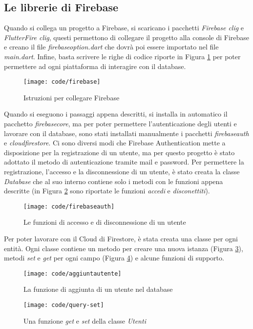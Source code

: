 \subsection{Le librerie di Firebase}
Quando si collega un progetto a Firebase, si scaricano i pacchetti \emph{Firebase \gls{clig}} e \emph{FlutterFire \gls{clig}}, questi permettono di collegare il progetto alla console di Firebase e creano il file \emph{firebase\textunderscore option.dart} che dovrà poi essere importato nel file \emph{main.dart}.\newline
Infine, basta scrivere le righe di codice riporte in Figura \ref{fig:code-firebase} per poter permettere ad ogni piattaforma di interagire con il database.
\begin{figure}[!h] 
    \centering 
    \texttt{[image: code/firebase]} 
    \caption{Istruzioni per collegare Firebase}
    \label{fig:code-firebase}
\end{figure}

Quando si eseguono i passaggi appena descritti, si installa in automatico il pacchetto \emph{firebase\textunderscore core}, ma per poter permettere l'autenticazione degli utenti e lavorare con il database, sono stati installati manualmente i pacchetti \emph{firebase\textunderscore auth} e \emph{cloud\textunderscore firestore}.\newline
\newline
Ci sono diversi modi che Firebase Authentication mette a disposizione per la registrazione di un utente, ma per questo progetto è stato adottato il metodo di autenticazione tramite mail e password.\newline
Per permettere la registrazione, l'accesso e la disconnessione di un utente, è stato creata la classe \emph{Database} che al suo interno contiene solo i metodi con le funzioni appena descritte (in Figura \ref{fig:code-authentication} sono riportate le funzioni \emph{accedi} e \emph{disconettiti}).
\begin{figure}[!h] 
    \centering 
    \texttt{[image: code/firebaseauth]} 
    \caption{Le funzioni di accesso e di disconnessione di un utente}
    \label{fig:code-authentication}
\end{figure}

\newpage

Per poter lavorare con il Cloud di Firestore, è stata creata una classe per ogni entità.\newline
Ogni classe contiene un metodo per creare una nuova istanza (Figura \ref{fig:code-aggiungi}), metodi \emph{set} e \emph{get} per ogni campo (Figura \ref{fig:code-query}) e alcune funzioni di supporto.
\begin{figure}[!h] 
    \centering 
    \texttt{[image: code/aggiuntautente]} 
    \caption{La funzione di aggiunta di un utente nel database}
    \label{fig:code-aggiungi}
\end{figure}
\begin{figure}[!h] 
    \centering 
    \texttt{[image: code/query-set]} 
    \caption{Una funzione \emph{get} e \emph{set} della classe \emph{Utenti}}
    \label{fig:code-query}
\end{figure}

